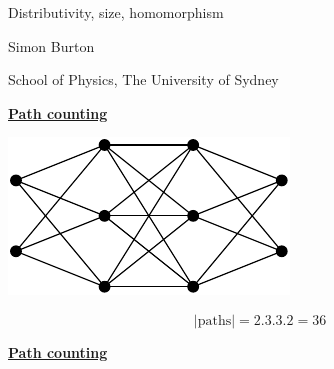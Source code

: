 \documentclass[11pt]{article}
\def\heading #1{\centerline{\underline{\bf\LARGE #1}}}
\def\vsp {\vskip 0.5cm}
\begin{document}
\large




\centerline{\LARGE }
\vskip 0.5cm
\centerline{\LARGE Distributivity, size, homomorphism}
\vskip 0.5cm
\centerline{\LARGE }

\vskip 1cm

\centerline{\Large Simon Burton}

\vskip 0.5cm

\centerline{School of Physics, The University of Sydney}


%
%
%

\newpage %

\heading{Path counting}

\vsp
\centerline{\includegraphics[]{pic-trellis.pdf}}
$$
    |\mbox{paths}| = 2.3.3.2 = 36
$$


\newpage %

\heading{Path counting}
\end{document}
